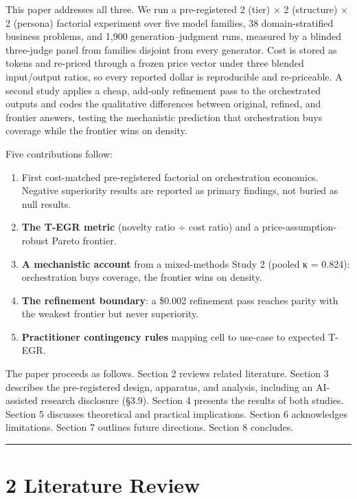 \documentclass[11pt,a4paper]{article}
\begin{document}
This paper addresses all three. We run a pre-registered 2 (tier) ×
2 (structure) × 2 (persona) factorial experiment over five model families,
38 domain-stratified business problems, and 1,900 generation–judgment
runs, measured by a blinded three-judge panel from families disjoint
from every generator. Cost is stored as tokens and re-priced through a
frozen price vector under three blended input/output ratios, so every
reported dollar is reproducible and re-priceable. A second study applies
a cheap, add-only refinement pass to the orchestrated outputs and codes
the qualitative differences between original, refined, and frontier
answers, testing the mechanistic prediction that orchestration buys
coverage while the frontier wins on density.

Five contributions follow:

\begin{enumerate}
\item \textit{}First cost-matched pre-registered factorial on orchestration
   economics.\textit{} Negative superiority results are reported as primary
   findings, not buried as null results.
\item \textbf{The T-EGR metric} (novelty ratio ÷ cost ratio) and a
   price-assumption-robust Pareto frontier.
\item \textbf{A mechanistic account} from a mixed-methods Study 2 (pooled κ =
   0.824): orchestration buys coverage, the frontier wins on density.
\item \textbf{The refinement boundary}: a \$0.002 refinement pass reaches parity
   with the weakest frontier but never superiority.
\item \textbf{Practitioner contingency rules} mapping cell to use-case to
   expected T-EGR.
\end{enumerate}


The paper proceeds as follows. Section 2 reviews related literature.
Section 3 describes the pre-registered design, apparatus, and analysis,
including an AI-assisted research disclosure (§3.9).
Section 4 presents the results of both studies. Section 5 discusses
theoretical and practical implications. Section 6 acknowledges
limitations. Section 7 outlines future directions. Section 8 concludes.

\hrule


\section{2 Literature Review}
\end{document}
